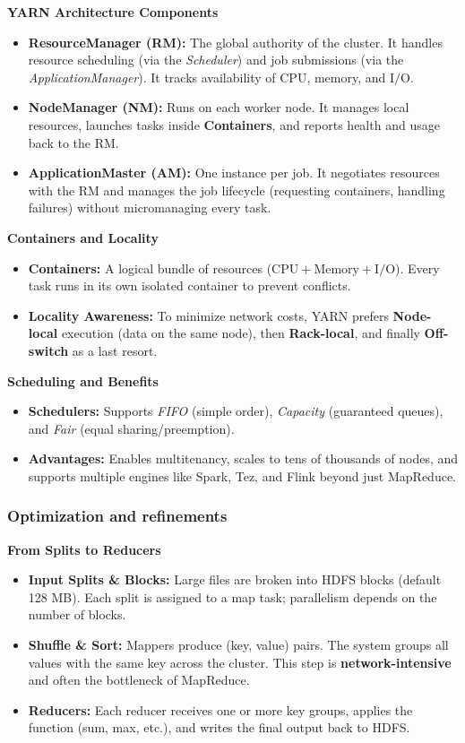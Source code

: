 \textbf{YARN Architecture Components}\begin{itemize}\item \textbf{ResourceManager (RM):} The global authority of the cluster. It handles resource scheduling (via the \textit{Scheduler}) and job submissions (via the \textit{ApplicationManager}). It tracks availability of $\text{CPU}$, memory, and $\text{I/O}$.\item \textbf{NodeManager (NM):} Runs on each worker node. It manages local resources, launches tasks inside \textbf{Containers}, and reports health and usage back to the RM.\item \textbf{ApplicationMaster (AM):} One instance per job. It negotiates resources with the RM and manages the job lifecycle (requesting containers, handling failures) without micromanaging every task.\end{itemize}\textbf{ Containers and Locality}\begin{itemize}\item \textbf{Containers:} A logical bundle of resources ($\text{CPU} + \text{Memory} + \text{I/O}$). Every task runs in its own isolated container to prevent conflicts.\item \textbf{Locality Awareness:} To minimize network costs, YARN prefers \textbf{Node-local} execution (data on the same node), then \textbf{Rack-local}, and finally \textbf{Off-switch} as a last resort.\end{itemize}\textbf{ Scheduling and Benefits}\begin{itemize}\item \textbf{Schedulers:} Supports \textit{FIFO} (simple order), \textit{Capacity} (guaranteed queues), and \textit{Fair} (equal sharing/preemption).\item \textbf{Advantages:} Enables multitenancy, scales to tens of thousands of nodes, and supports multiple engines like Spark, Tez, and Flink beyond just MapReduce.\end{itemize}

\subsubsection{Optimization and refinements}

\textbf{From Splits to Reducers}
\begin{itemize}
    \item \textbf{Input Splits \& Blocks:} Large files are broken into HDFS blocks (default 128 MB). Each split is assigned to a map task; parallelism depends on the number of blocks.
    \item \textbf{Shuffle \& Sort:} Mappers produce (key, value) pairs. The system groups all values with the same key across the cluster. This step is \textbf{network-intensive} and often the bottleneck of MapReduce.
    \item \textbf{Reducers:} Each reducer receives one or more key groups, applies the function (sum, max, etc.), and writes the final output back to HDFS.
\end{itemize}



